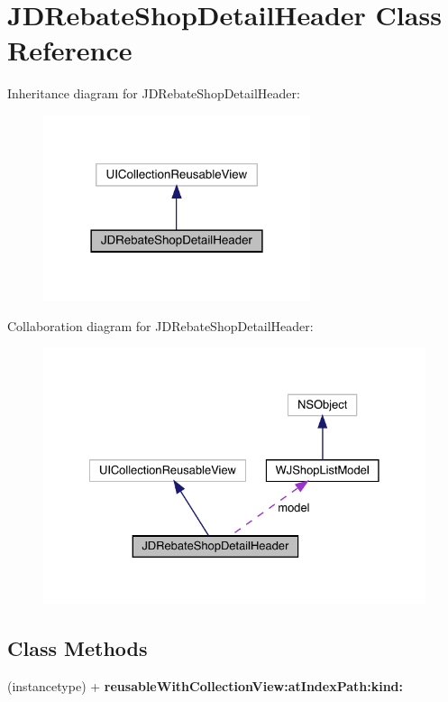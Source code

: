 \hypertarget{interface_j_d_rebate_shop_detail_header}{}\section{J\+D\+Rebate\+Shop\+Detail\+Header Class Reference}
\label{interface_j_d_rebate_shop_detail_header}


Inheritance diagram for J\+D\+Rebate\+Shop\+Detail\+Header\+:\nopagebreak
\begin{figure}[H]
\begin{center}
\leavevmode
\includegraphics[width=222pt]{interface_j_d_rebate_shop_detail_header__inherit__graph}
\end{center}
\end{figure}


Collaboration diagram for J\+D\+Rebate\+Shop\+Detail\+Header\+:\nopagebreak
\begin{figure}[H]
\begin{center}
\leavevmode
\includegraphics[width=328pt]{interface_j_d_rebate_shop_detail_header__coll__graph}
\end{center}
\end{figure}
\subsection*{Class Methods}
\begin{DoxyCompactItemize}
\item 
\mbox{\label{interface_j_d_rebate_shop_detail_header_a9973bf1bca30151bf72b168c68c1b517}} 
(instancetype) + {\bfseries reusable\+With\+Collection\+View\+:at\+Index\+Path\+:kind\+:}
\end{DoxyCompactItemize}
